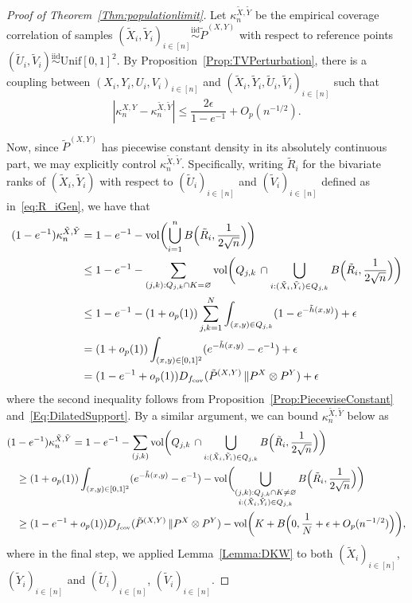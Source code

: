 \documentclass[11pt]{article}
\newcommand{\vol}{\mathrm{vol}}
\newcommand{\iid}{\stackrel{\mathrm{iid}}\sim}
\begin{document}
\begin{proof}[Proof of Theorem~\ref{Thm:populationlimit}]
Let $\kappa_n^{\tilde X, \tilde Y}$ be the empirical coverage correlation of samples $(\tilde X_i, \tilde Y_i)_{i\in[n]}\iid \tilde P^{(X,Y)}$ with respect to reference points $(\tilde U_i,\tilde V_i)\iid \mathrm{Unif}[0,1]^2$. By Proposition~\ref{Prop:TVPerturbation}, there is a coupling between $(X_i,Y_i,U_i,V_i)_{i\in[n]}$ and $(\tilde X_i, \tilde Y_i,\tilde U_i,\tilde V_i)_{i\in[n]}$ such that
\begin{equation}
\label{Eq:EmpiricalCoverageApprox}
|\kappa_n^{X,Y} - \kappa_n^{\tilde X,\tilde Y}|\leq \frac{2\epsilon}{1-e^{-1}} + O_p(n^{-1/2}).
\end{equation}

Now, since $\tilde P^{(X,Y)}$ has piecewise constant density in its absolutely continuous part, we may explicitly control $\kappa_n^{\tilde X, \tilde Y}$. Specifically, writing $\tilde R_i$ for the bivariate ranks of $(\tilde X_i,\tilde Y_i)$ with respect to $(\tilde U_i)_{i\in[n]}$ and $(\tilde V_i)_{i\in[n]}$ defined as in~\eqref{eq:R_iGen}, we have that
\begin{align*}
(1-e^{-1})\kappa_n^{\tilde X, \tilde Y} &= 1-e^{-1} -\vol\biggl(\bigcup_{i=1}^n B\Bigl(\tilde R_i, \frac{1}{2\sqrt{n}}\Bigr)\biggr)\nonumber \\
&\leq 1-e^{-1} - \sum_{(j,k):Q_{j,k}\cap K=\varnothing} \vol\biggl(Q_{j,k}\,\cap \bigcup_{i:(\tilde X_i,\tilde Y_i)\in Q_{j,k}} B\Bigl(\tilde R_i, \frac{1}{2\sqrt{n}}\Bigr)\biggr)\nonumber\\
&\leq 1-e^{-1} - (1+o_p(1))\sum_{j,k=1}^N \int_{(x,y)\in Q_{j,k}} (1-e^{-\tilde h(x,y)}) + \epsilon\nonumber\\
& = (1+o_p(1))\int_{(x,y)\in[0,1]^2} (e^{-\tilde h(x,y)}-e^{-1}) + \epsilon\nonumber\\
&= (1-e^{-1}+o_p(1))D_{f_\mathrm{cov}}(\tilde P^{(X,Y)}\,\| P^X\otimes P^Y)  + \epsilon 
\end{align*}
where the second inequality follows from Proposition~\ref{Prop:PiecewiseConstant} and~\eqref{Eq:DilatedSupport}. By a similar argument, we can bound $\kappa_n^{\tilde X, \tilde Y}$ below as
\begin{align}
    (1&-e^{-1})\kappa_n^{\tilde X, \tilde Y} =  1-e^{-1} - \sum_{(j,k)} \vol\biggl(Q_{j,k}\,\cap \bigcup_{i:(\tilde X_i,\tilde Y_i)\in Q_{j,k}} B\Bigl(\tilde R_i, \frac{1}{2\sqrt{n}}\Bigr)\biggr) \nonumber \\
    &\geq (1+o_p(1))\int_{(x,y)\in[0,1]^2} (e^{-\tilde h(x,y)}-e^{-1}) - \vol\biggl(\bigcup_{\substack{(j,k):Q_{j,k}\cap K\neq\varnothing\\ i:(\tilde X_i,\tilde Y_i)\in Q_{j,k}}} B\Bigl(\tilde R_i,\frac{1}{2\sqrt{n}}\Bigr)\biggr)\nonumber\\
    &\geq (1-e^{-1}+o_p(1))D_{f_\mathrm{cov}}(\tilde P^{(X,Y)}\,\| P^X\otimes P^Y) - \vol\biggl(K + B\Bigl(0,  \frac{1}{N} + \epsilon + O_p(n^{-1/2})\Bigr)\biggr),\label{Eq:PiecewiseConstantLower}
\end{align}
where in the final step, we applied Lemma~\ref{Lemma:DKW} to both $(\tilde X_i)_{i\in[n]}$, $(\tilde Y_i)_{i\in[n]}$ and $(\tilde U_i)_{i\in[n]}$, $(\tilde V_i)_{i\in[n]}$. 


\end{proof}
\end{document}
